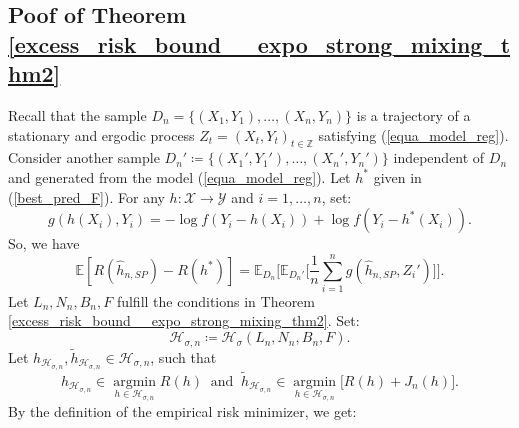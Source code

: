 \documentclass[10pt,twoside]{article}
\numberwithin{equation}{section}
\newcommand{\E}{\ensuremath{\mathbb{E}}}
\newcommand{\Z}{\ensuremath{\mathbb{Z}}}
\DeclareMathOperator*{\argmin}{argmin}
\begin{document}
\subsection{Poof of Theorem \ref{excess_risk_bound__expo_strong_mixing_thm2}}
%
Recall that the sample $ D_n = \{ (X_1, Y_1), \dots, (X_n, Y_n) \}$ is a trajectory of a stationary and ergodic process $Z_t = (X_t, Y_t)_{t\in \Z}$ satisfying (\ref{equa_model_reg}).
%
Consider another sample $ D_n' \coloneqq  \{ (X_1', Y_1'), \dots, (X_n', Y_n') \}$ independent of $D_n$ and generated from the model (\ref{equa_model_reg}). 
% 
Let $h^*$ given in (\ref{best_pred_F}). 
For any  $h : \mathcal{X} \to \mathcal{Y}$ and $i= 1,\dots,n$, set:  
%
\begin{equation}\label{equa_proof_decomp_excess_risk_V1}
g(h(X_i), Y_i) = -\log f(Y_i - h(X_i)) + \log f(Y_i - h^*(X_i)).
\end{equation}
% 
%
%
So, we have
%
%
\begin{equation}\label{equa_proof_excess_risk_v1}
\E[R(\widehat{h}_{n,SP}) - R(h^*) ]=  \E_{D_n} \Big[\E_{D_n'} \Big[\dfrac{1}{n} \sum_{i=1}^n g(\widehat{h}_{n,SP}, Z_i')\Big] \Big].
\end{equation}
%
%
Let $L_n, N_n, B_n, F$ fulfill the conditions in Theorem \ref{excess_risk_bound__expo_strong_mixing_thm2}. Set:
%
\[\mathcal{H}_{\sigma, n} \coloneqq \mathcal{H}_{\sigma}(L_n, N_n, B_n, F).
\]
% 
%
%
Let $h_{\mathcal{H}_{\sigma, n}}, \widetilde{ h}_{\mathcal{H}_{\sigma, n}} \in \mathcal{H}_{\sigma, n}$, such that
%
\begin{equation*}
 h_{\mathcal{H}_{\sigma, n}} \in \underset{h\in \mathcal{H}_{\sigma, n} }{\argmin} R(h) ~\text{ and } ~ \widetilde{h}_{\mathcal{H}_{\sigma, n}} \in \underset{h\in \mathcal{H}_{\sigma, n} }{\argmin} \Big[R(h) + J_n(h) \Big].  \end{equation*}
%
%
By the definition of the empirical risk minimizer, we get:
%
%
\end{document}
